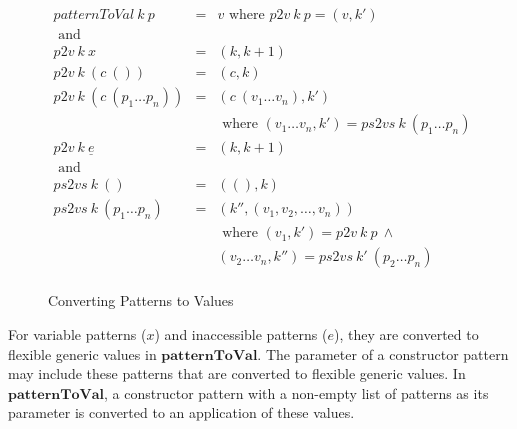\begin{figure}[H]
  \begin{equation*}
    \begin{aligned}
      patternToVal \: k \: p             & = & v \textrm{ where } p2v \: k \: p = (v,k')                           \\
      \textrm{ and }                     &   &                                                                     \\
      p2v \: k \: x                      & = & (k,k+1)                                                             \\
      p2v \: k \: (c \: ())              & = & (c,k)                                                               \\
      p2v \: k \: (c \: (p_1 \dots p_n)) & = & (c \: (v_1 \dots v_n),k')                                           \\
                                         &   & \textrm{ where } (v_1 \dots v_n,k') = ps2vs \: k \: (p_1 \dots p_n) \\
      p2v \: k \: \underline{e}          & = & (k,k+1)                                                             \\
      \textrm{ and }                     &   &                                                                     \\
      ps2vs \: k \: ()                   & = & ((),k)                                                              \\
      ps2vs \: k \: (p_1 \dots p_n)      & = & (k'',(v_1,v_2,\dots,v_n))                                           \\
                                         &   & \textrm{ where } (v_1,k') = p2v \: k \: p \: \land                  \\
                                         &   & (v_2 \dots v_n,k'') = ps2vs \: k' \: (p_2 \dots p_n)                \\
    \end{aligned}
  \end{equation*}
  \caption{Converting Patterns to Values}
\end{figure}

For variable patterns ($x$) and inaccessible patterns (\underline{$e$}), they are converted to flexible generic values in $\boldsymbol{patternToVal}$. The parameter of a constructor pattern may include these patterns that are converted to flexible generic values. In $\boldsymbol{patternToVal}$, a constructor pattern with a non-empty list of patterns as its parameter is converted to an application of these values.

